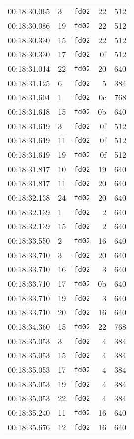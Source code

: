 \documentclass{article}
\begin{document}
\begin{longtable}{lllrr}
00:18:30.065 & 3 & \texttt{fd02} & 22 & 512 \\
00:18:30.086 & 19 & \texttt{fd02} & 22 & 512 \\
00:18:30.330 & 15 & \texttt{fd02} & 22 & 512 \\
00:18:30.330 & 17 & \texttt{fd02} & 0f & 512 \\
00:18:31.014 & 22 & \texttt{fd02} & 20 & 640 \\
00:18:31.125 & 6 & \texttt{fd02} & 5 & 384 \\
00:18:31.604 & 1 & \texttt{fd02} & 0c & 768 \\
00:18:31.618 & 15 & \texttt{fd02} & 0b & 640 \\
00:18:31.619 & 3 & \texttt{fd02} & 0f & 512 \\
00:18:31.619 & 11 & \texttt{fd02} & 0f & 512 \\
00:18:31.619 & 19 & \texttt{fd02} & 0f & 512 \\
00:18:31.817 & 10 & \texttt{fd02} & 19 & 640 \\
00:18:31.817 & 11 & \texttt{fd02} & 20 & 640 \\
00:18:32.138 & 24 & \texttt{fd02} & 20 & 640 \\
00:18:32.139 & 1 & \texttt{fd02} & 2 & 640 \\
00:18:32.139 & 15 & \texttt{fd02} & 2 & 640 \\
00:18:33.550 & 2 & \texttt{fd02} & 16 & 640 \\
00:18:33.710 & 3 & \texttt{fd02} & 20 & 640 \\
00:18:33.710 & 16 & \texttt{fd02} & 3 & 640 \\
00:18:33.710 & 17 & \texttt{fd02} & 0b & 640 \\
00:18:33.710 & 19 & \texttt{fd02} & 3 & 640 \\
00:18:33.710 & 20 & \texttt{fd02} & 16 & 640 \\
00:18:34.360 & 15 & \texttt{fd02} & 22 & 768 \\
00:18:35.053 & 3 & \texttt{fd02} & 4 & 384 \\
00:18:35.053 & 15 & \texttt{fd02} & 4 & 384 \\
00:18:35.053 & 17 & \texttt{fd02} & 4 & 384 \\
00:18:35.053 & 19 & \texttt{fd02} & 4 & 384 \\
00:18:35.053 & 22 & \texttt{fd02} & 4 & 384 \\
00:18:35.240 & 11 & \texttt{fd02} & 16 & 640 \\
00:18:35.676 & 12 & \texttt{fd02} & 16 & 640 \\

\end{longtable}
\end{document}
